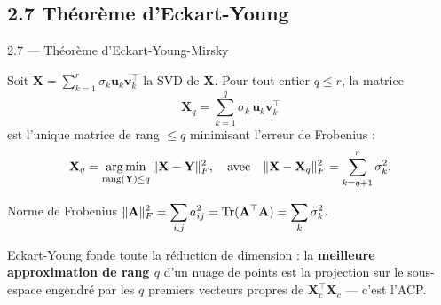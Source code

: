 \subsection{2.7 Théorème d'Eckart-Young}
\begin{frame}{2.7 — Théorème d'Eckart-Young-Mirsky}
\begin{theorem}
Soit $\mathbf{X} = \sum_{k=1}^r \sigma_k \mathbf{u}_k \mathbf{v}_k^\top$ la SVD de $\mathbf{X}$.
Pour tout entier $q \leq r$, la matrice
\[
\mathbf{X}_q = \sum_{k=1}^q \sigma_k \, \mathbf{u}_k \mathbf{v}_k^\top
\]
est l'unique matrice de rang $\leq q$ minimisant l'erreur de Frobenius :
\[
\mathbf{X}_q = \operatorname*{arg\,min}_{\operatorname{rang}(\mathbf{Y}) \leq q} \|\mathbf{X} - \mathbf{Y}\|_F^2,
\quad
\text{avec}
\quad
\|\mathbf{X} - \mathbf{X}_q\|_F^2 = \sum_{k=q+1}^{r} \sigma_k^2.
\]
\end{theorem}

\begin{block}{Norme de Frobenius}
\small $\displaystyle \|\mathbf{A}\|_F^2 = \sum_{i,j} a_{ij}^2 = \operatorname{Tr}(\mathbf{A}^\top \mathbf{A}) = \sum_k \sigma_k^2$.
\end{block}

\begin{rema}
\small Eckart-Young fonde \alert{toute la réduction de dimension} : la
\textbf{meilleure approximation de rang $q$} d'un nuage de points est la
projection sur le sous-espace engendré par les $q$ premiers vecteurs propres
de $\mathbf{X}_c^\top \mathbf{X}_c$ — c'est l'ACP.
\end{rema}
\end{frame}


